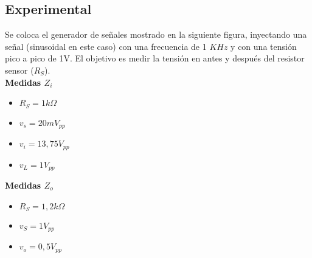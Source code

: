 \begin{multicols}{2}
    \subsection{Experimental}
    \sangria{} Se coloca el generador de señales mostrado en la siguiente figura, inyectando una señal (sinusoidal en este caso) con una frecuencia de 1 $KHz$ y con una tensión pico a pico de 1V. El objetivo es medir la tensión en antes y después del resistor sensor ($R_S$).\\
    \textbf{Medidas $Z_i$}
    \begin{itemize}[nosep]
        \item $R_S = 1k \Omega$
        \item $v_s = 20mV_{pp}$
        \item $v_i = 13,75 V_{pp}$
        \item $v_L = 1V_{pp}$
    \end{itemize}
\begin{minipage}[t]{\linewidth}
    \textbf{Medidas $Z_o$}
    \begin{itemize}[nosep]
        \item $R_S = 1,2k\Omega$
        \item $v_S = 1V_{pp}$
        \item $v_o = 0,5 V_{pp}$
    \end{itemize}
\end{minipage}
\end{multicols}
